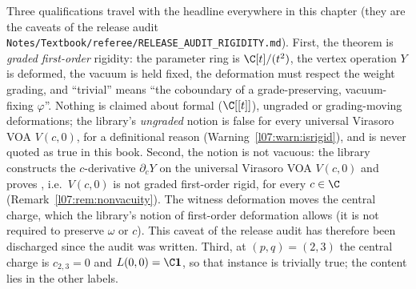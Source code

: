 Three qualifications travel with the headline everywhere in this chapter (they are the caveats of the
release audit \texttt{Notes/Textbook/referee/RELEASE\_AUDIT\_RIGIDITY.md}). First, the theorem is
\emph{graded first-order} rigidity: the parameter ring is $\C[t]/(t^2)$, the vertex operation $Y$ is
deformed, the vacuum is held fixed, the deformation must respect the weight grading, and ``trivial''
means ``the coboundary of a grade-preserving, vacuum-fixing $\varphi$''. Nothing is claimed about formal
($\C[[t]]$), ungraded or grading-moving deformations; the library's \emph{ungraded} notion
 is false for every universal Virasoro VOA $V(c,0)$, for a definitional reason
(Warning~\ref{l07:warn:isrigid}), and is never quoted as true in this book. Second, the notion
 is not vacuous: the library constructs the $c$-derivative $\partial_cY$ on the universal
Virasoro VOA $V(c,0)$ and proves \allowbreak{}\allowbreak{}\allowbreak{}\allowbreak{}, i.e.\ $V(c,0)$ is not graded first-order rigid,
for every $c\in\C$ (Remark~\ref{l07:rem:nonvacuity}). The witness deformation moves the central charge, which the
library's notion of first-order deformation allows (it is not required to preserve $\omega$ or $c$). This caveat of
the release audit has therefore been discharged since the audit was written. Third, at $(p,q) = (2,3)$ the central charge is $c_{2,3} = 0$
and $L(0,0) = \C\lsevenvac$, so that instance is trivially true; the content lies in the other labels.

